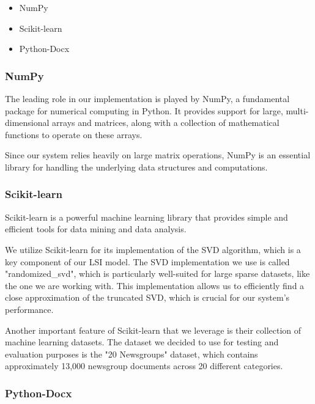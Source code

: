 \documentclass[12pt,a4paper]{article}
\begin{document}
    \begin{itemize}
        \item NumPy
        \item Scikit-learn
        \item Python-Docx
    \end{itemize}

        \noindent
        \subsubsection{NumPy}

        \noindent The leading role in our implementation is played by NumPy, a fundamental package for numerical computing in Python. It provides support for large, multi-dimensional arrays and matrices, along with a collection of mathematical functions to operate on these arrays.

        \bigskip  
        \noindent Since our system relies heavily on large matrix operations, NumPy is an essential library for handling the underlying data structures and computations.

        \bigskip
        \subsubsection{Scikit-learn}

        \noindent Scikit-learn is a powerful machine learning library that provides simple and efficient tools for data mining and data analysis.
        
        \bigskip
        \noindent We utilize Scikit-learn for its implementation of the SVD algorithm, which is a key component of our LSI model. The SVD implementation we use is called "randomized\_svd", which is particularly well-suited for large sparse datasets, like the one we are working with. This implementation allows us to efficiently find a close approximation of the truncated SVD, which is crucial for our system's performance.

        \bigskip
        \noindent Another important feature of Scikit-learn that we leverage is their collection of machine learning datasets. The dataset we decided to use for testing and evaluation purposes is the "20 Newsgroups" dataset, which contains approximately 13,000 newsgroup documents across 20 different categories.


        \bigskip
        \subsubsection{Python-Docx}
\end{document}
